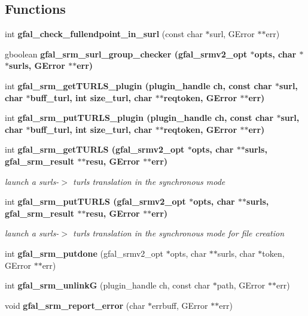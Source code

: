 \subsection*{Functions}
\begin{CompactItemize}
\item 
int \textbf{gfal\_\-check\_\-fullendpoint\_\-in\_\-surl} (const char $\ast$surl, GError $\ast$$\ast$err)\label{gfal__common__srm__internal__layer_8h_d12926fb068b66769f28f2c4fc177bd2}

\item 
gboolean \bf{gfal\_\-srm\_\-surl\_\-group\_\-checker} (gfal\_\-srmv2\_\-opt $\ast$opts, char $\ast$$\ast$surls, GError $\ast$$\ast$err)
\item 
int \bf{gfal\_\-srm\_\-get\-TURLS\_\-plugin} (plugin\_\-handle ch, const char $\ast$surl, char $\ast$buff\_\-turl, int size\_\-turl, char $\ast$$\ast$reqtoken, GError $\ast$$\ast$err)
\item 
int \bf{gfal\_\-srm\_\-put\-TURLS\_\-plugin} (plugin\_\-handle ch, const char $\ast$surl, char $\ast$buff\_\-turl, int size\_\-turl, char $\ast$$\ast$reqtoken, GError $\ast$$\ast$err)
\item 
int \bf{gfal\_\-srm\_\-get\-TURLS} (gfal\_\-srmv2\_\-opt $\ast$opts, char $\ast$$\ast$surls, gfal\_\-srm\_\-result $\ast$$\ast$resu, GError $\ast$$\ast$err)
\begin{CompactList}\small\item\em launch a surls-$>$ turls translation in the synchronous mode \item\end{CompactList}\item 
int \bf{gfal\_\-srm\_\-put\-TURLS} (gfal\_\-srmv2\_\-opt $\ast$opts, char $\ast$$\ast$surls, gfal\_\-srm\_\-result $\ast$$\ast$resu, GError $\ast$$\ast$err)
\begin{CompactList}\small\item\em launch a surls-$>$ turls translation in the synchronous mode for file creation \item\end{CompactList}\item 
int \textbf{gfal\_\-srm\_\-putdone} (gfal\_\-srmv2\_\-opt $\ast$opts, char $\ast$$\ast$surls, char $\ast$token, GError $\ast$$\ast$err)\label{gfal__common__srm__internal__layer_8h_0b73cfc8697e7ab0d68dc121047f405f}

\item 
int \textbf{gfal\_\-srm\_\-unlink\-G} (plugin\_\-handle ch, const char $\ast$path, GError $\ast$$\ast$err)\label{gfal__common__srm__internal__layer_8h_46ce9d66bcd7db433a250e0949603622}

\item 
void \textbf{gfal\_\-srm\_\-report\_\-error} (char $\ast$errbuff, GError $\ast$$\ast$err)\label{gfal__common__srm__internal__layer_8h_233010cc6723f86456203d1193fcb648}

\end{CompactItemize}
